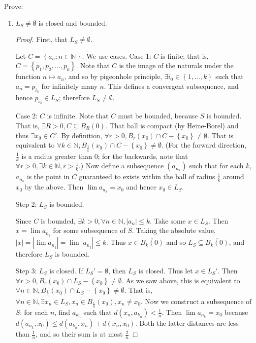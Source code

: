 \documentclass{article}
\newcommand{\N}{\mathbb{N}}
\newcommand{\abs}[1]{\left| #1 \right|}
\newcommand{\set}[1]{\left\{ #1 \right\}}
\newcommand{\ol}[1]{\overline{#1}}
\begin{document}
Prove:
\begin{enumerate}
    \item 
    $L_S \ne \emptyset$ is closed and bounded.
    \begin{proof}
        First, that $L_S \ne \emptyset$.

        Let $C = \set{a_n : n \in \N}$. We use cases. Case 1: $C$ is finite; that is, $C = \set{p_1, p_2, \dots, p_k}$. Note that $C$ is the image of the naturals under the function $n \mapsto a_n$, and so by pigeonhole principle, $\exists i_0 \in \set{1, \dots, k}$ such that $a_n = p_{i_0}$ for infinitely many $n$. This defines a convergent subsequence, and hence $p_{i_0} \in L_S$; therefore $L_S \ne \emptyset$.

        Case 2: $C$ is infinite. Note that $C$ must be bounded, because $S$ is bounded. That is, $\exists R > 0, C \subseteq B_R(0)$. That ball is compact (by Heine-Borel) and thus $\exists x_0 \in C'$. By definition, $\forall r > 0, B_r(x_0) \cap C - \set{x_0} \ne \emptyset$. That is equivalent to $\forall k \in \N, B_{\frac{1}{k}}(x_0) \cap C - \set{x_0} \ne \emptyset$. (For the forward direction, $\frac{1}{k}$ is a radius greater than $0$; for the backwards, note that $\forall r > 0, \exists k \in \N, r > \frac{1}{k}$.) Now define a subsequence $(a_{n_k})$ such that for each $k$, $a_{n_k}$ is the point in $C$ guaranteed to exists within the ball of radius $\frac{1}{k}$ around $x_0$ by the above. Then $\lim a_{n_k} = x_0$ and hence $x_0 \in L_S$. 

        Step 2: $L_S$ is bounded.

        Since $C$ is bounded, $\exists k > 0, \forall n \in \N, \abs{a_n} \le k$. Take some $x \in L_S$. Then $x = \lim a_{n_j}$ for some subsequence of $S$. Taking the absolute value, $\abs{x} = \abs{\lim a_{n_j}} = \lim \abs{a_{n_j}} \le k$. Thus $x \in \ol{B_k(0)}$ and so $L_S \subseteq \ol{B_k(0)}$, and therefore $L_S$ is bounded.

        Step 3: $L_S$ is closed. If $L_S' = \emptyset$, then $L_S$ is closed. Thus let $x \in L_S'$. Then $\forall r > 0, B_r(x_0) \cap L_S - \set{x_0} \ne \emptyset$. As we saw above, this is equivalent to $\forall n \in \N, B_{\frac{1}{n}}(x_0) \cap L_S - \set{x_0} \ne \emptyset$. That is, $\forall n \in \N, \exists x_n \in L_S, x_n \in B_{\frac{1}{n}}(x_0), x_n \ne x_0$. Now we construct a subsequence of $S$: for each $n$, find $a_{k_n}$ such that $d(x_n, a_{k_n}) < \frac{1}{n}$. Then $\lim a_{n_k} = x_0$ because $d(a_{n_k}, x_0) \le d(a_{k_n}, x_n) + d(x_n, x_0)$. Both the latter distances are less than $\frac{1}{n}$, and so their sum is at most $\frac{2}{n}$
        

\end{proof}
\end{enumerate}
\end{document}
